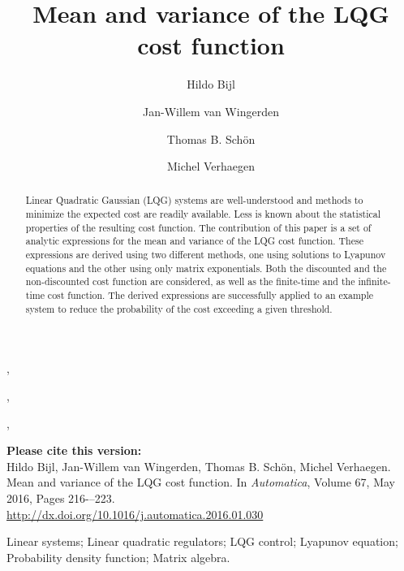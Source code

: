 \documentclass[twocolumn]{autart}
\begin{document}
	
\setcounter{page}{1}

\begin{frontmatter}
\title{Mean and variance of the LQG cost function}

\author[DCSC]{Hildo Bijl},
\author[DCSC]{Jan-Willem van Wingerden},
\author[ITUU]{Thomas B. Sch\"on},
\author[DCSC]{Michel Verhaegen}

\address[DCSC]{Delft Center for Systems and Control, Delft University of Technology, The Netherlands}                                    
\address[ITUU]{Department of Information Technology, Uppsala University, Sweden}

\vspace{0.9cm}

\begin{center}
	\begin{varwidth}{14cm}
	\normalsize 
	\textbf{Please cite this version:}\\
	Hildo Bijl, Jan-Willem van Wingerden, Thomas B. Sch\"on, Michel Verhaegen. 
	Mean and variance of the LQG cost function. In \textit{Automatica}, Volume 67, May 2016, Pages 216-–223.\\
	\url{http://dx.doi.org/10.1016/j.automatica.2016.01.030}
	\end{varwidth}
\end{center}

\vspace{0.1cm}

\begin{keyword}
Linear systems; Linear quadratic regulators; LQG control; Lyapunov equation; Probability density function; Matrix algebra.
\end{keyword}

\begin{abstract}
Linear Quadratic Gaussian (LQG) systems are well-understood and methods to minimize the expected cost are readily available. Less is known about the statistical properties of the resulting cost function. The contribution of this paper is a set of analytic expressions for the mean and variance of the LQG cost function. These expressions are derived using two different methods, one using solutions to Lyapunov equations and the other using only matrix exponentials. Both the discounted and the non-discounted cost function are considered, as well as the finite-time and the infinite-time cost function. The derived expressions are successfully applied to an example system to reduce the probability of the cost exceeding a given threshold.
\end{abstract}

\end{frontmatter}
\end{document}
